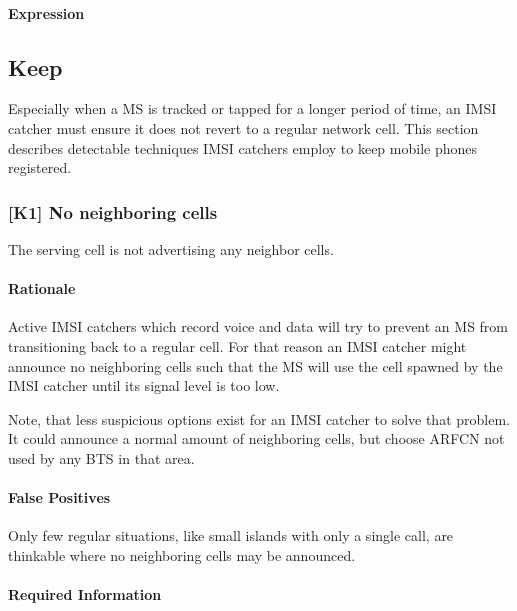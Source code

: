 \documentclass[a4paper,11pt,notitlepage,bigheadings,oneside]{scrartcl}
\begin{document}

\paragraph{Expression}


\subsection{Keep}

Especially when a MS is tracked or tapped for a longer period of time, an IMSI
catcher must ensure it does not revert to a regular network cell. This section
describes detectable techniques IMSI catchers employ to keep mobile phones
registered.

\subsubsection{[K1] No neighboring cells}

The serving cell is not advertising any neighbor cells.

\paragraph{Rationale}

Active IMSI catchers which record voice and data will try to prevent an MS from
transitioning back to a regular cell. For that reason an IMSI catcher might
announce no neighboring cells such that the MS will use the cell spawned by the
IMSI catcher until its signal level is too low.

Note, that less suspicious options exist for an IMSI catcher to solve that
problem. It could announce a normal amount of neighboring cells, but choose
ARFCN not used by any BTS in that area.

\paragraph{False Positives}

Only few regular situations, like small islands with only a single call, are
thinkable where no neighboring cells may be announced.


\paragraph{Required Information}
\end{document}
